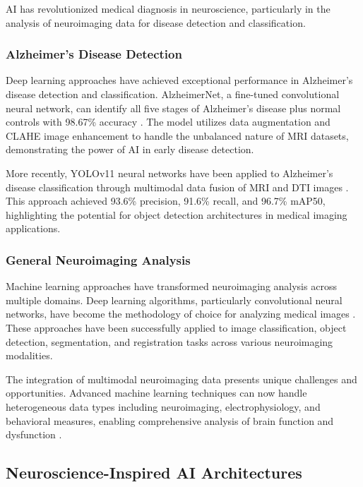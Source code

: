 \documentclass[conference]{IEEEtran}
\begin{document}
AI has revolutionized medical diagnosis in neuroscience, particularly in the analysis of neuroimaging data for disease detection and classification.

\subsubsection{Alzheimer's Disease Detection}

Deep learning approaches have achieved exceptional performance in Alzheimer's disease detection and classification. AlzheimerNet, a fine-tuned convolutional neural network, can identify all five stages of Alzheimer's disease plus normal controls with 98.67\% accuracy \citep{shamratAlzheimerNetEffectiveDeep2023}. The model utilizes data augmentation and CLAHE image enhancement to handle the unbalanced nature of MRI datasets, demonstrating the power of AI in early disease detection.

More recently, YOLOv11 neural networks have been applied to Alzheimer's disease classification through multimodal data fusion of MRI and DTI images \citep{hechkelEarlyDetectionClassification2025}. This approach achieved 93.6\% precision, 91.6\% recall, and 96.7\% mAP50, highlighting the potential for object detection architectures in medical imaging applications.

\subsubsection{General Neuroimaging Analysis}

Machine learning approaches have transformed neuroimaging analysis across multiple domains. Deep learning algorithms, particularly convolutional neural networks, have become the methodology of choice for analyzing medical images \citep{litjensSurveyDeepLearning2017}. These approaches have been successfully applied to image classification, object detection, segmentation, and registration tasks across various neuroimaging modalities.

The integration of multimodal neuroimaging data presents unique challenges and opportunities. Advanced machine learning techniques can now handle heterogeneous data types including neuroimaging, electrophysiology, and behavioral measures, enabling comprehensive analysis of brain function and dysfunction \citep{lorenziIntegrationMultimodalData2023}.

\subsection{Neuroscience-Inspired AI Architectures}
\end{document}
